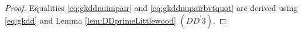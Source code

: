 \documentclass[10pt,a4paper]{article}
\numberwithin{equation}{section}
\newcommand{\N}{\mathbb{N}}
\begin{document}
\begin{proof}
	Equalities \eqref{eq:gkddnuimpair} and \eqref{eq:gkddnupairbvtquot} are
	derived using \eqref{eq:gkdd} and Lemma \ref{lem:DDprimeLittlewood} $%
	(DD^{\prime }3)$.
\end{proof}
\end{document}

